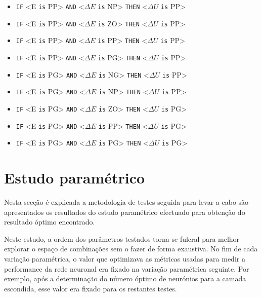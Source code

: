 \documentclass{article}
\begin{document}
\begin{itemize}
	\item \texttt{IF} <E \texttt{is} PP> \texttt{AND} <$\Delta E$ \texttt{is} NP> \texttt{THEN} <$\Delta U$ \texttt{is} PP>
	\item \texttt{IF} <E \texttt{is} PP> \texttt{AND} <$\Delta E$ \texttt{is} ZO> \texttt{THEN} <$\Delta U$ \texttt{is} PP>
	\item \texttt{IF} <E \texttt{is} PP> \texttt{AND} <$\Delta E$ \texttt{is} PP> \texttt{THEN} <$\Delta U$ \texttt{is} PP>
	\item \texttt{IF} <E \texttt{is} PP> \texttt{AND} <$\Delta E$ \texttt{is} PG> \texttt{THEN} <$\Delta U$ \texttt{is} PP>
	\item \texttt{IF} <E \texttt{is} PG> \texttt{AND} <$\Delta E$ \texttt{is} NG> \texttt{THEN} <$\Delta U$ \texttt{is} PP>
	\item \texttt{IF} <E \texttt{is} PG> \texttt{AND} <$\Delta E$ \texttt{is} NP> \texttt{THEN} <$\Delta U$ \texttt{is} PP>
	\item \texttt{IF} <E \texttt{is} PG> \texttt{AND} <$\Delta E$ \texttt{is} ZO> \texttt{THEN} <$\Delta U$ \texttt{is} PG>
	\item \texttt{IF} <E \texttt{is} PG> \texttt{AND} <$\Delta E$ \texttt{is} PP> \texttt{THEN} <$\Delta U$ \texttt{is} PG>
	\item \texttt{IF} <E \texttt{is} PG> \texttt{AND} <$\Delta E$ \texttt{is} PG> \texttt{THEN} <$\Delta U$ \texttt{is} PG>
\end{itemize}

\clearpage
\section{Estudo paramétrico}
\indent \indent Nesta secção é explicada a metodologia de testes seguida para levar a cabo são apresentados os resultados do estudo paramétrico efectuado para obtenção do resultado óptimo encontrado.

Neste estudo, a ordem dos parâmetros testados torna-se fulcral para melhor explorar o espaço de combinações sem o fazer de forma exaustiva. No fim de cada variação paramétrica, o valor que optimizava as métricas usadas para medir a performance da rede neuronal era fixado na variação paramétrica seguinte. Por exemplo, após a determinação do número óptimo de neurónios para a camada escondida, esse valor era fixado para os restantes testes.
\end{document}
